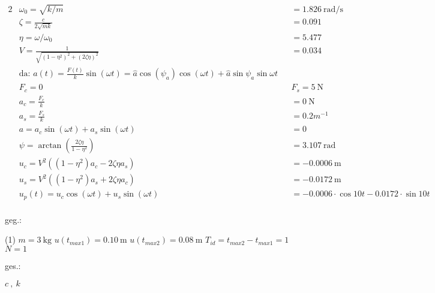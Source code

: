     \begin{solution}
        \begin{alignat*}{2}
            &\omega_0 = \sqrt{k/m} &&= \SI{1.826}{\radian\per\second} \\
            &\zeta = \frac{c}{2\sqrt{mk}} &&= 0.091 \\
            &\eta = \omega/\omega_0 &&= 5.477\\
            &V = \frac{1}{\sqrt{(1 - \eta^2)^2 + (2\zeta\eta)^2}} &&= 0.034\\
            &\text{da: } a(t) = \frac{F(t)}{k} \sin(\omega t) = \hat{a} \cos(\psi_a) \cos(\omega t) + \hat{a} \sin{\psi_a} \sin{\omega t} \\
            &F_c = 0 && F_s = \SI{5}{\newton} \\
            &a_c = \frac{F_c}{k} &&= \SI{0}{\newton}\\ 
            &a_s = \frac{F_s}{k} &&= 0.2 m^{-1} \\
            &a= a_c \sin(\omega t) + a_s \sin(\omega t) &&= 0 \\
            &\psi = \arctan(\frac{2\zeta \eta}{1-\eta^2}) &&= \SI{3.107}{\radian}\\
            &u_c = V^2((1-\eta^2)a_c - 2 \zeta \eta a_s) &&= \SI{-0.0006}{\meter}\\
            &u_s = V^2((1 - \eta^2)a_s + 2 \zeta \eta a_c) &&= \SI{-0.0172}{\meter}\\
            &u_p(t)= u_c \cos(\omega t) + u_s \sin(\omega t) &&= -0.0006 \cdot \cos{10t} - 0.0172 \cdot \sin{10t}\\
        \end{alignat*}
    \end{solution}
        



    \begin{minipage}[t]{.49\linewidth}
        geg.:
        \begin{tasks} (1)
           \task[] $m = \SI{3}{\kilo\gram}$
           \task[] $u(t_{max1}) = \SI{0.10}{\meter}$
           \task[] $u(t_{max2}) = \SI{0.08}{\meter}$
           \task[] $T_{id} = t_{max2}-t_{max1} = 1$
           \task[] $N = 1$
        \end{tasks}
        \end{minipage}
        \begin{minipage}[t]{.49\linewidth}
        ges.:
        \begin{tasks}
            \task$c ~,~ k$
        \end{tasks}
    \end{minipage}\\
    \vspace{1cm}


